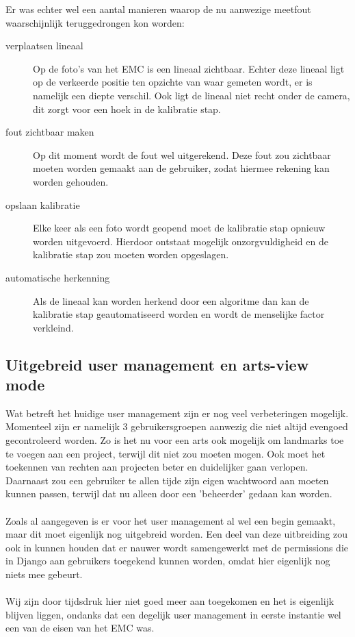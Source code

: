 Er was echter wel een aantal manieren waarop de nu aanwezige meetfout waarschijnlijk teruggedrongen kon worden:
\begin{description}
	\item[verplaatsen lineaal] Op de foto's van het EMC is een lineaal zichtbaar. 
	Echter deze lineaal ligt op de verkeerde positie ten opzichte van waar gemeten wordt, er is namelijk een diepte verschil. 
	Ook ligt de lineaal niet recht onder de camera, dit zorgt voor een hoek in de kalibratie stap.
	\item[fout zichtbaar maken] Op dit moment wordt de fout wel uitgerekend. 
	Deze fout zou zichtbaar moeten worden gemaakt aan de gebruiker, zodat hiermee rekening kan worden gehouden.
	\item[opslaan kalibratie] Elke keer als een foto wordt geopend moet de kalibratie stap opnieuw worden uitgevoerd. 
	Hierdoor ontstaat mogelijk onzorgvuldigheid en de kalibratie stap zou moeten worden opgeslagen.
	\item[automatische herkenning] Als de lineaal kan worden herkend door een algoritme dan kan de kalibratie stap geautomatiseerd worden en wordt de menselijke factor verkleind.
\end{description}

\subsection{Uitgebreid user management en arts-view mode} %
Wat betreft het huidige user management zijn er nog veel verbeteringen mogelijk.
Momenteel zijn er namelijk 3 gebruikersgroepen aanwezig die niet altijd evengoed gecontroleerd worden.
Zo is het nu voor een arts ook mogelijk om landmarks toe te voegen aan een project, terwijl dit niet zou moeten mogen.
Ook moet het toekennen van rechten aan projecten beter en duidelijker gaan verlopen.
Daarnaast zou een gebruiker te allen tijde zijn eigen wachtwoord aan moeten kunnen passen, terwijl dat nu alleen door een 'beheerder' gedaan kan worden.
\\
\\
Zoals al aangegeven is er voor het user management al wel een begin gemaakt, maar dit moet eigenlijk nog uitgebreid worden.
Een deel van deze uitbreiding zou ook in kunnen houden dat er nauwer wordt samengewerkt met de permissions die in Django aan gebruikers toegekend kunnen worden, omdat hier eigenlijk nog niets mee gebeurt.
\\
\\
Wij zijn door tijdsdruk hier niet goed meer aan toegekomen en het is eigenlijk blijven liggen, ondanks dat een degelijk user management in eerste instantie wel een van de eisen van het EMC was.

